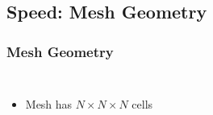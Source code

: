\documentclass{beamer}
\begin{document}
\subsection{Speed: Mesh Geometry}
\begin{frame}
\frametitle{Mesh Geometry}
\begin{columns}[c]
  \begin{itemize}
      \item Mesh has $N\times N \times N$ cells
  \end{itemize}

\end{columns}
\end{frame}
\end{document}
